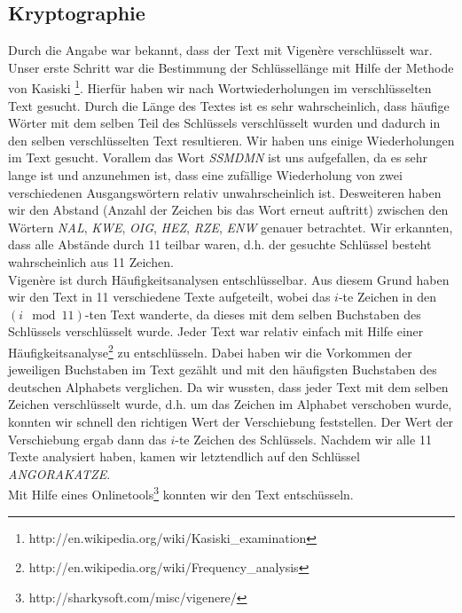 \documentclass[12pt]{article}
\begin{document}
\subsection{Kryptographie}

Durch die Angabe war bekannt, dass der Text mit Vigenère verschlüsselt war. Unser erste Schritt war die Bestimmung der Schlüssellänge mit Hilfe der Methode von Kasiski \footnote{http://en.wikipedia.org/wiki/Kasiski\_examination}. Hierfür haben wir nach Wortwiederholungen im verschlüsselten Text gesucht. Durch die Länge des Textes ist es sehr wahrscheinlich, dass häufige Wörter mit dem selben Teil des Schlüssels verschlüsselt wurden und dadurch in den selben verschlüsselten Text resultieren. Wir haben uns einige Wiederholungen im Text gesucht. Vorallem das Wort \emph{SSMDMN} ist uns aufgefallen, da es sehr lange ist und anzunehmen ist, dass eine zufällige Wiederholung von zwei verschiedenen Ausgangswörtern relativ unwahrscheinlich ist. Desweiteren haben wir den Abstand (Anzahl der Zeichen bis das Wort erneut auftritt) zwischen den Wörtern \emph{NAL}, \emph{KWE}, \emph{OIG}, \emph{HEZ}, \emph{RZE}, \emph{ENW} genauer betrachtet. Wir erkannten, dass alle Abstände durch 11 teilbar waren, d.h. der gesuchte Schlüssel besteht wahrscheinlich aus 11 Zeichen. \\
Vigenère ist durch Häufigkeitsanalysen entschlüsselbar. Aus diesem Grund haben wir den Text in 11 verschiedene Texte aufgeteilt, wobei das $i$-te Zeichen in den $(i\mod 11)$-ten Text wanderte, da dieses mit dem selben Buchstaben des Schlüssels verschlüsselt wurde. Jeder Text war relativ einfach mit Hilfe einer Häufigkeitsanalyse\footnote{http://en.wikipedia.org/wiki/Frequency\_analysis} zu entschlüsseln. Dabei haben wir die Vorkommen der jeweiligen Buchstaben im Text gezählt und mit den häufigsten Buchstaben des deutschen Alphabets verglichen. Da wir wussten, dass jeder Text mit dem selben Zeichen verschlüsselt wurde, d.h. um das Zeichen im Alphabet verschoben wurde, konnten wir schnell den richtigen Wert der Verschiebung feststellen. Der Wert der Verschiebung ergab dann das $i$-te Zeichen des Schlüssels. Nachdem wir alle 11 Texte analysiert haben, kamen wir letztendlich auf den Schlüssel \emph{ANGORAKATZE}.\\
Mit Hilfe eines Onlinetools\footnote{http://sharkysoft.com/misc/vigenere/} konnten wir den Text entschüsseln. 
\end{document}
